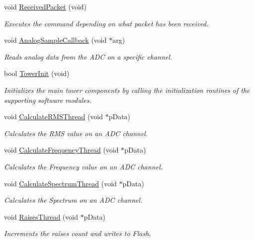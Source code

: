 \begin{DoxyCompactItemize}
void \hyperlink{group__main__module_gaf57dd4c5e7e444cfe5571d411f9548c9}{Received\+Packet} (void)
\begin{DoxyCompactList}\small\item\em Executes the command depending on what packet has been received. \end{DoxyCompactList}\item 
void \hyperlink{group__main__module_ga5bb615c293d6b116d3c327bd223f2a4a}{Analog\+Sample\+Callback} (void $\ast$arg)
\begin{DoxyCompactList}\small\item\em Reads analog data from the A\+D\+C on a specific channel. \end{DoxyCompactList}\item 
bool \hyperlink{group__main__module_gaeda7b585d318b7b1476285b82b6fed11}{Tower\+Init} (void)
\begin{DoxyCompactList}\small\item\em Initializes the main tower components by calling the initialization routines of the supporting software modules. \end{DoxyCompactList}\item 
void \hyperlink{group__main__module_ga202b6a897d73aca5d3d20cde43ce7a54}{Calculate\+R\+M\+S\+Thread} (void $\ast$p\+Data)
\begin{DoxyCompactList}\small\item\em Calculates the R\+M\+S value on an A\+D\+C channel. \end{DoxyCompactList}\item 
void \hyperlink{group__main__module_ga39400542b35c71e63af9b23a072c2412}{Calculate\+Frequency\+Thread} (void $\ast$p\+Data)
\begin{DoxyCompactList}\small\item\em Calculates the Frequency value on an A\+D\+C channel. \end{DoxyCompactList}\item 
void \hyperlink{group__main__module_ga41af216646a8e64f0bc0767a77244c4c}{Calculate\+Spectrum\+Thread} (void $\ast$p\+Data)
\begin{DoxyCompactList}\small\item\em Calculates the Spectrum on an A\+D\+C channel. \end{DoxyCompactList}\item 
void \hyperlink{group__main__module_gad6f4e9bc8436aeebcc4776b05a7173ae}{Raises\+Thread} (void $\ast$p\+Data)
\begin{DoxyCompactList}\small\item\em Increments the raises count and writes to Flash. \end{DoxyCompactList}\item 

\end{DoxyCompactItemize}
